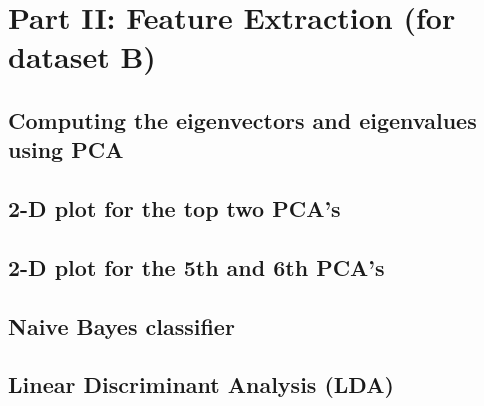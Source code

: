 \section{Part II: Feature Extraction (for dataset B)}
\subsection{Computing the eigenvectors and eigenvalues using PCA}


\subsection{2-D plot for the top two PCA's}



\subsection{2-D plot for the 5th and 6th PCA's}

\subsection{Naive Bayes classifier}

\subsection{Linear Discriminant Analysis (LDA)}

